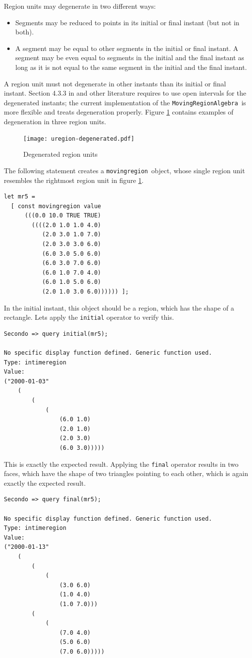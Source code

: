 \documentclass[a4paper,12pt]{article}
\newcommand{\mra}{{\tt Moving\-Region\-Algebra}}
\newcommand{\mr}{{\tt movingregion}}
\begin{document}
Region units may degenerate in two different ways:
\begin{itemize}
  \item Segments may be reduced
    to points in its initial or final instant (but not in both).
  \item A segment may be equal to other segments in
    the initial or final instant. A segment may be even equal to 
    segments in the initial and the final instant as long as it is not
    equal to the same segment in the initial and the final instant.
\end{itemize}
A region unit must not degenerate in other instants than its initial
or final instant. Section 4.3.3 in \cite{GuS04} and other literature
requires to use open
intervals for the degenerated instants; the current implementation of
the \mra\ is more flexible and treats degeneration properly.
Figure \ref{creating:simple2} contains examples of
degeneration in three region units.
\begin{figure}
  \begin{center}
    \texttt{[image: uregion-degenerated.pdf]}
  \end{center}
  \caption{Degenerated region units}
  \label{creating:simple2}
\end{figure}

The following statement creates a \mr\ object, whose single region
unit resembles the rightmost region unit in figure \ref{creating:simple2}.
\begin{verbatim}
let mr5 =
  [ const movingregion value
      (((0.0 10.0 TRUE TRUE)
        ((((2.0 1.0 1.0 4.0)
           (2.0 3.0 1.0 7.0)
           (2.0 3.0 3.0 6.0)
           (6.0 3.0 5.0 6.0)
           (6.0 3.0 7.0 6.0)
           (6.0 1.0 7.0 4.0)
           (6.0 1.0 5.0 6.0)
           (2.0 1.0 3.0 6.0)))))) ];
\end{verbatim}
In the initial instant, this object should be a region, which has the
shape of a rectangle. Lets apply the {\tt initial} operator to verify this.
\begin{verbatim}
Secondo => query initial(mr5);

No specific display function defined. Generic function used.
Type: intimeregion
Value: 
("2000-01-03" 
    (
        (
            (
                (6.0 1.0) 
                (2.0 1.0) 
                (2.0 3.0) 
                (6.0 3.0)))))
\end{verbatim}
This is exactly the expected result. Applying the {\tt final} operator
results in two faces, which have the shape of two triangles pointing to
each other, which is again exactly the expected result.
\begin{verbatim}
Secondo => query final(mr5);

No specific display function defined. Generic function used.
Type: intimeregion
Value:
("2000-01-13" 
    (
        (
            (
                (3.0 6.0) 
                (1.0 4.0) 
                (1.0 7.0))) 
        (
            (
                (7.0 4.0) 
                (5.0 6.0) 
                (7.0 6.0)))))
\end{verbatim}
\end{document}
